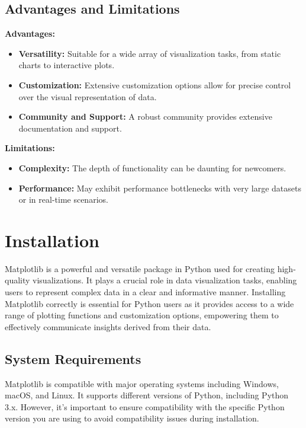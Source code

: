 \subsection{Advantages and Limitations}

\textbf{Advantages:}
\begin{itemize}
	\item \textbf{Versatility:} Suitable for a wide array of visualization tasks, from static charts to interactive plots.
	\item \textbf{Customization:} Extensive customization options allow for precise control over the visual representation of data.
	\item \textbf{Community and Support:} A robust community provides extensive documentation and support.
\end{itemize}

\textbf{Limitations:}
\begin{itemize}
	\item \textbf{Complexity:} The depth of functionality can be daunting for newcomers.
	\item \textbf{Performance:} May exhibit performance bottlenecks with very large datasets or in real-time scenarios.
\end{itemize}



\section{Installation}


Matplotlib is a powerful and versatile package in Python used for creating high-quality visualizations. It plays a crucial role in data visualization tasks, enabling users to represent complex data in a clear and informative manner. Installing Matplotlib correctly is essential for Python users as it provides access to a wide range of plotting functions and customization options, empowering them to effectively communicate insights derived from their data.

\subsection{System Requirements}
Matplotlib is compatible with major operating systems including Windows, macOS, and Linux. It supports different versions of Python, including Python 3.x. However, it's important to ensure compatibility with the specific Python version you are using to avoid compatibility issues during installation.

